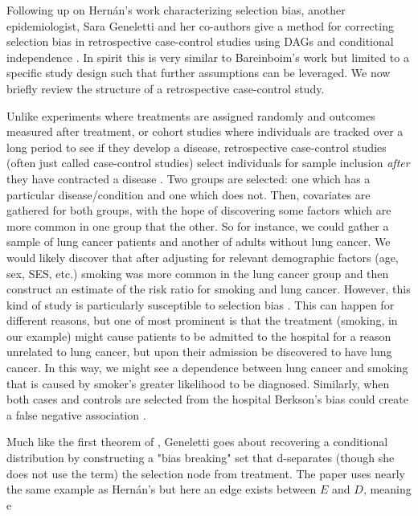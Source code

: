 \documentclass[12pt,twoside]{reedthesis}
\theoremstyle{definition}
\begin{document}
Following up on Hern\'an's work characterizing selection bias, another epidemiologist, Sara Geneletti and her co-authors give a method for correcting selection bias in retrospective case-control studies using DAGs and conditional independence \citep{Geneletti_2008}. In spirit this is very similar to Bareinboim's work but limited to a specific study design such that further assumptions can be leveraged.  We now briefly review the structure of a retrospective case-control study. 

Unlike experiments where treatments are assigned randomly and outcomes measured after treatment, or cohort studies where individuals are tracked over a long period to see if they develop a disease, retrospective case-control studies (often just called case-control studies) select individuals for sample inclusion \emph{after} they have contracted a disease \citep{Woodward_1999}. Two groups are selected: one which has a particular disease/condition and one which does not. Then, covariates are gathered for both groups, with the hope of discovering some factors which are more common in one group that the other. So for instance, we could gather a sample of lung cancer patients and another of adults without lung cancer. We would likely discover that after adjusting for relevant demographic factors (age, sex, SES, etc.) smoking was more common in the lung cancer group and then construct an estimate of the risk ratio for smoking and lung cancer. However, this kind of study is particularly susceptible to selection bias \citep{Woodward_1999} \citep{Geneletti_2008}. This can happen for different reasons, but one of most prominent is that the treatment (smoking, in our example) might cause patients to be admitted to the hospital for a reason unrelated to lung cancer, but upon their admission be discovered to have lung cancer. In this way, we might see a dependence between lung cancer and smoking that is caused by smoker's greater likelihood to be diagnosed.  Similarly, when both cases and controls are selected from the hospital Berkson's bias could create a false negative association \citep{Hernan_2004}.  

Much like the first theorem of \cite{Bareinboim_2014}, Geneletti goes about recovering a conditional distribution by constructing a "bias breaking" set that d-separates (though she does not use the term) the selection node from treatment. The paper uses nearly the same example as Hern\'an's but here an edge exists between $E$ and $D$, meaning e
\end{document}
